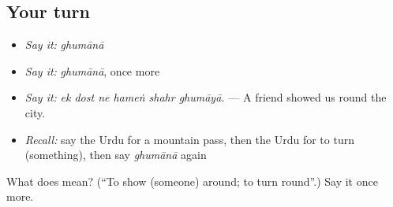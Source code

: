 \subsection*{Your turn}
\begin{itemize}
\raggedright
  \item \emph{Say it:} \emph{ghumānā}
  \item \emph{Say it:} \emph{ghumānā}, once more
  \item \emph{Say it:} \emph{ek dost ne hameṅ shahr ghumāyā.} — A friend showed us round the city.
  \item \emph{Recall:} say the Urdu for a mountain pass, then the Urdu for to turn (something), then say \emph{ghumānā} again
\end{itemize}

\begin{tcolorbox}[breakable,colback=teal!4,colframe=teal!35!black,title={Before you move on}]
What does  mean? (\textquotedblleft{}To show (someone) around; to turn round\textquotedblright{}.) Say it once more.
\end{tcolorbox}
